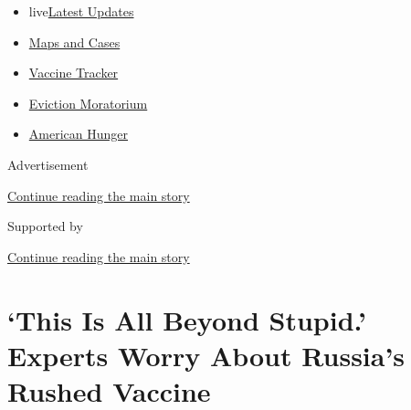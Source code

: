 \begin{itemize}
\tightlist
\item
  live\href{https://www.nytimes3xbfgragh.onion/2020/09/05/world/coronavirus-covid.html?name=styln-coronavirus-national\&region=TOP_BANNER\&block=storyline_menu_recirc\&action=click\&pgtype=Article\&impression_id=75bc9471-efba-11ea-81ab-99b37689be52\&variant=undefined}{Latest
  Updates}
\item
  \href{https://www.nytimes3xbfgragh.onion/interactive/2020/us/coronavirus-us-cases.html?name=styln-coronavirus-national\&region=TOP_BANNER\&block=storyline_menu_recirc\&action=click\&pgtype=Article\&impression_id=75bc9472-efba-11ea-81ab-99b37689be52\&variant=undefined}{Maps
  and Cases}
\item
  \href{https://www.nytimes3xbfgragh.onion/interactive/2020/science/coronavirus-vaccine-tracker.html?name=styln-coronavirus-national\&region=TOP_BANNER\&block=storyline_menu_recirc\&action=click\&pgtype=Article\&impression_id=75bc9473-efba-11ea-81ab-99b37689be52\&variant=undefined}{Vaccine
  Tracker}
\item
  \href{https://www.nytimes3xbfgragh.onion/2020/09/02/your-money/eviction-moratorium-covid.html?name=styln-coronavirus-national\&region=TOP_BANNER\&block=storyline_menu_recirc\&action=click\&pgtype=Article\&impression_id=75bc9474-efba-11ea-81ab-99b37689be52\&variant=undefined}{Eviction
  Moratorium}
\item
  \href{https://www.nytimes3xbfgragh.onion/interactive/2020/09/02/magazine/food-insecurity-hunger-us.html?name=styln-coronavirus-national\&region=TOP_BANNER\&block=storyline_menu_recirc\&action=click\&pgtype=Article\&impression_id=75bc9475-efba-11ea-81ab-99b37689be52\&variant=undefined}{American
  Hunger}
\end{itemize}

Advertisement

\protect\hyperlink{after-top}{Continue reading the main story}

Supported by

\protect\hyperlink{after-sponsor}{Continue reading the main story}

\hypertarget{this-is-all-beyond-stupid-experts-worry-about-russias-rushed-vaccine}{%
\section{`This Is All Beyond Stupid.' Experts Worry About Russia's
Rushed
Vaccine}\label{this-is-all-beyond-stupid-experts-worry-about-russias-rushed-vaccine}}

